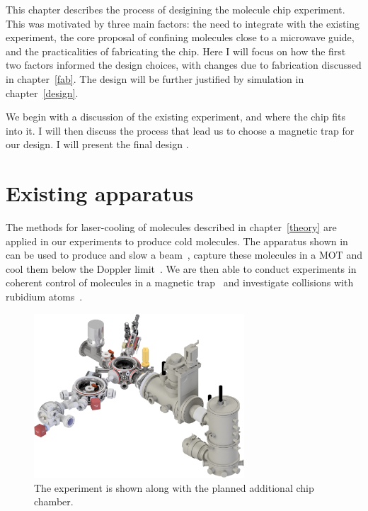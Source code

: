 This chapter describes the process of desigining the molecule chip experiment.
This was motivated by three main factors: the need to integrate with the
existing experiment, the core proposal of confining molecules close to a
microwave guide, and the practicalities of fabricating the chip. Here I will
focus on how the first two factors informed the design choices, with changes
due to fabrication discussed in chapter~\ref{fab}. The design will be further
justified by simulation in chapter~\ref{design}.

We begin with a discussion of
the existing experiment, and where the chip fits into it. I will then discuss
the process that lead us to choose a magnetic trap for our design. I will
present the final design . 

\section{Existing \CaF{} apparatus}


The methods for laser-cooling of molecules described in
chapter~\ref{theory} are applied in our experiments to produce cold \CaF{}
molecules. The apparatus shown in  can be
used to produce and slow a \CaF{} beam~\cite{PhysRevA.89.053416, Truppe2017a}, capture these
molecules in a MOT and cool them below the Doppler limit~\cite{Truppe2017}. We
are then able to conduct experiments in coherent control of molecules in a
magnetic trap~\cite{PhysRevLett.124.063001} and investigate collisions with
rubidium atoms~\cite{PhysRevLett.126.153401, Jurgilas2021}.

\begin{figure}[htb]
  \centering
  \includegraphics[width=0.7\textwidth]{figs/overview/apparatus_04_crp.png}
  \caption{
    The \CaF{} experiment is shown along with the planned additional chip
    chamber.}
  \label{overview:fig:vacuumsystem}
\end{figure}

